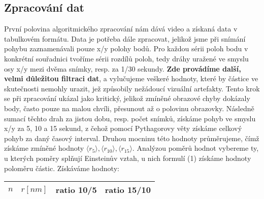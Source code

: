 \documentclass[czech,11pt,a4paper]{article}
\begin{document}
\begin{multicols}{2}
		\subsection{Zpracování dat}
		První polovina algoritmického zpracování nám dává video a získaná data v tabulkovém formátu. Data je potřeba dále zpracovat, jelikož jsme při snímání pohybu zaznamenávali pouze x/y polohy bodů.
		Pro každou sérii poloh bodu v konkrétní souřadnici tvoříme sérii rozdílů poloh, tedy dráhy uražené ve smyslu osy x/y mezi dvěma snímky, resp. za 1/30 sekundy. \textbf{Zde provádíme další, velmi důležitou filtraci dat}, a vylučujeme veškeré hodnoty, které by částice ve skutečnosti nemohly urazit, jež způsobily nežádoucí vizuální artefakty. Tento krok se při zpracování ukázal jako kritický, jelikož zmíněné obrazové chyby dokázaly body, často pouze na malou chvíli, přesunout až o polovinu obrazovky. Následně sumací těchto drah za jistou dobu, resp. počet snímků, získáme pohyb ve smyslu x/y za 5, 10 a 15 sekund, z čehož pomocí Pythagorovy věty získáme celkový pohyb za daný časový interval. Druhou mocninu této hodnoty průměrujeme, čímž získáme zmíněné hodnoty  $\langle r_5 \rangle, \langle r_{10} \rangle, \langle r_{15}\rangle$. Analýzou poměrů hodnot vybereme ty, u kterých poměry splňují Einsteinův vztah, u nich formulí (1) získáme hodnoty poloměru částic.
		Získáváme hodnoty:\\
		\begin{center}
			\begin{tabular}{|r|r|r|r|}
				\hline
				$n                                            $&$ r[nm]     $& ratio 10/5   & ratio 15/10  \\ \hline
				

\end{tabular}
\end{center}
\end{multicols}
\end{document}
